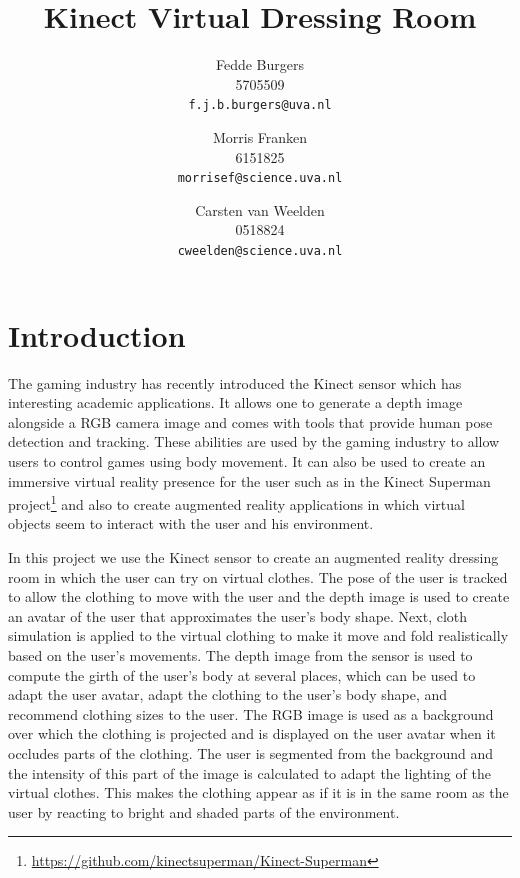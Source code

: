 \documentclass[a4paper]{article}
\title{Kinect Virtual Dressing Room}
\author{Fedde Burgers \\ 5705509 \\ \texttt{f.j.b.burgers@uva.nl} \and Morris Franken \\ 6151825 \\ \texttt{morrisef@science.uva.nl} \and Carsten van Weelden \\ 0518824 \\ \texttt{cweelden@science.uva.nl}}
\begin{document}
\maketitle

\begin{abstract}

\end{abstract}

\par{}

\section{Introduction}
\label{sec:introduction}

The gaming industry has recently introduced the Kinect sensor which has interesting academic applications. It allows one to generate a depth image alongside a RGB camera image and comes with tools that provide human pose detection and tracking. These abilities are used by the gaming industry to allow users to control games using body movement. It can also be used to create an immersive virtual reality presence for the user such as in the Kinect Superman project\footnote{\url{https://github.com/kinectsuperman/Kinect-Superman}} and also to create augmented reality applications in which virtual objects seem to interact with the user and his environment.

In this project we use the Kinect sensor to create an augmented reality dressing room in which the user can try on virtual clothes. The pose of the user is tracked to allow the clothing to move with the user and the depth image is used to create an avatar of the user that approximates the user's body shape. Next, cloth simulation is applied to the virtual clothing to make it move and fold realistically based on the user's movements. The depth image from the sensor is used to compute the girth of the user's body at several places, which can be used to adapt the user avatar, adapt the clothing to the user's body shape, and recommend clothing sizes to the user. The RGB image is used as a background over which the clothing is projected and is displayed on the user avatar when it occludes parts of the clothing. The user is segmented from the background and the intensity of this part of the image is calculated to adapt the lighting of the virtual clothes. This makes the clothing appear as if it is in the same room as the user by reacting to bright and shaded parts of the environment.
\end{document}

